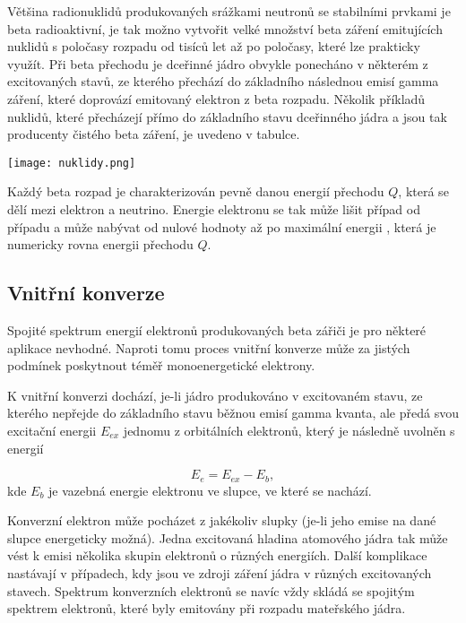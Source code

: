 \documentclass[../../main.tex]{subfiles}
\begin{document}
Většina radionuklidů produkovaných srážkami neutronů se stabilními prvkami je beta radioaktivní, je tak možno vytvořit velké množství beta záření emitujících nuklidů s poločasy rozpadu od tisíců let až po poločasy, které lze prakticky využít. Při beta přechodu je dceřinné jádro obvykle ponecháno v některém z excitovaných stavů, ze kterého přechází do základního následnou emisí gamma záření, které doprovází emitovaný elektron z beta rozpadu. Několik příkladů nuklidů, které přecházejí přímo do základního stavu dceřinného jádra a jsou tak producenty čistého beta záření, je uvedeno v tabulce.

\begin{center}
	\texttt{[image: nuklidy.png]}
\end{center}

Každý beta rozpad je charakterizován pevně danou energií přechodu $Q$, která se dělí mezi elektron a neutrino. Energie elektronu se tak může lišit případ od případu a může nabývat od nulové hodnoty až po maximální energii , která je numericky rovna energii přechodu $Q$.  

\subsection{Vnitřní konverze}

Spojité spektrum energií elektronů produkovaných beta zářiči je pro některé aplikace nevhodné. Naproti tomu proces vnitřní konverze může za jistých podmínek poskytnout téměř monoenergetické elektrony. 

K vnitřní konverzi dochází, je-li jádro produkováno v excitovaném stavu, ze kterého nepřejde do základního stavu běžnou emisí gamma kvanta, ale předá svou excitační energii $E_{ex}$ jednomu z orbitálních elektronů, který je následně uvolněn s energií

\begin{equation}
E_e = E_{ex} - E_b,
\end{equation} 
kde $E_b$ je vazebná energie elektronu ve slupce, ve které se nachází. 

Konverzní elektron může pocházet z jakékoliv slupky (je-li jeho emise na dané slupce energeticky možná). Jedna excitovaná hladina atomového jádra tak může vést k emisi několika skupin elektronů o různých energiích. Další komplikace nastávají v případech, kdy jsou ve zdroji záření jádra v různých excitovaných stavech. Spektrum konverzních elektronů se navíc vždy skládá se spojitým spektrem elektronů, které byly emitovány při rozpadu mateřského jádra. 
\end{document}
